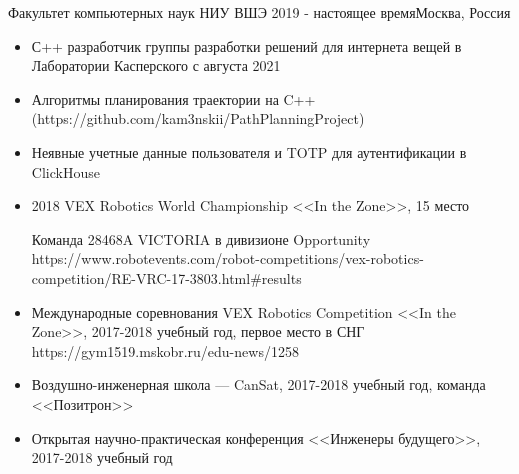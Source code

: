 \documentclass[10pt,a4paper]{altacv}
\begin{document}
\tagline{}

\begin{fullwidth}
\makecvheader
\end{fullwidth}


 {Факультет компьютерных наук НИУ ВШЭ }{2019 - настоящее время}{Москва, Россия} 
\textsc{}
\\
\textsc{}

\begin{itemize}
\item С++ разработчик группы разработки решений для интернета вещей в Лаборатории Касперского с августа 2021
\end{itemize}

\begin{itemize}
\item Алгоритмы планирования траектории на C++ (https://github.com/kam3nskii/PathPlanningProject)
\item Неявные учетные данные пользователя и TOTP для аутентификации в ClickHouse
\end{itemize}

\begin{itemize}
\item 2018 VEX Robotics World Championship <<In the Zone>>, 15 место


Команда 28468A VICTORIA в дивизионе Opportunity
https://www.robotevents.com/robot-competitions/vex-robotics-competition/RE-VRC-17-3803.html\#results


\item Международные соревнования VEX Robotics Competition <<In the Zone>>, 2017-2018 учебный год, первое место в СНГ
https://gym1519.mskobr.ru/edu-news/1258

\item Воздушно-инженерная школа — CanSat, 2017-2018 учебный год, команда <<Позитрон>>
\item Открытая научно-практическая конференция <<Инженеры будущего>>, 2017-2018 учебный год
\end{itemize}
\end{document}
